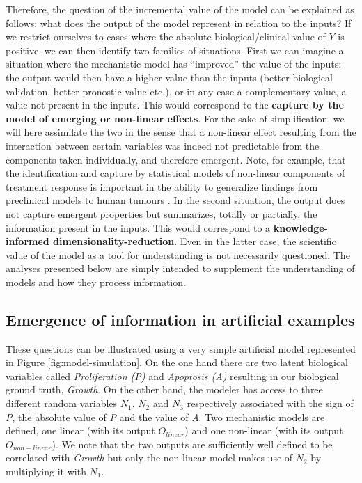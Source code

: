\documentclass[a4paper,12pt,twoside,onecolumn,openright,final,oldfontcommands]{memoir}
\begin{document}
Therefore, the question of the incremental value of the model can be
explained as follows: what does the output of the model represent in
relation to the inputs? If we restrict ourselves to cases where the
absolute biological/clinical value of \(Y\) is positive, we can then
identify two families of situations. First we can imagine a situation
where the mechanistic model has ``improved'' the value of the inputs:
the output would then have a higher value than the inputs (better
biological validation, better pronostic value etc.), or in any case a
complementary value, a value not present in the inputs. This would
correspond to the \textbf{capture by the model of emerging or non-linear
effects}. For the sake of simplification, we will here assimilate the
two in the sense that a non-linear effect resulting from the interaction
between certain variables was indeed not predictable from the components
taken individually, and therefore emergent. Note, for example, that the
identification and capture by statistical models of non-linear
components of treatment response is important in the ability to
generalize findings from preclinical models to human tumours
\citep{mourragui2020precise}. In the second situation, the output does
not capture emergent properties but summarizes, totally or partially,
the information present in the inputs. This would correspond to a
\textbf{knowledge-informed dimensionality-reduction}. Even in the latter
case, the scientific value of the model as a tool for understanding is
not necessarily questioned. The analyses presented below are simply
intended to supplement the understanding of models and how they process
information.

\subsection{Emergence of information in artificial
examples}\label{emergence-of-information-in-artificial-examples}

These questions can be illustrated using a very simple artificial model
represented in Figure \ref{fig:model-simulation}. On the one hand there
are two latent biological variables called \emph{Proliferation (P)} and
\emph{Apoptosis (A)} resulting in our biological ground truth,
\emph{Growth}. On the other hand, the modeler has access to three
different random variables \(N_1\), \(N_2\) and \(N_3\) respectively
associated with the sign of \emph{P}, the absolute value of \emph{P} and
the value of \emph{A}. Two mechanistic models are defined, one linear
(with its output \(O_{linear}\)) and one non-linear (with its output
\(O_{non-linear}\)). We note that the two outputs are sufficiently well
defined to be correlated with \emph{Growth} but only the non-linear
model makes use of \(N_2\) by multiplying it with \(N_1\).
\end{document}
